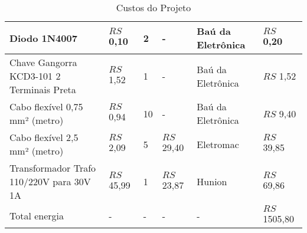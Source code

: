 \begin{table}[h!]
\begin{tabular}{| m{4cm}|m{2cm}|m{2cm}|m{2cm}|m{2cm}|m{2cm}|}
Diodo 1N4007 & $RS$ 0,10 & 2 & - & Baú da Eletrônica & $RS$ 0,20 \\\hline
Chave Gangorra KCD3-101 2 Terminais Preta & $RS$ 1,52 & 1 & - & Baú da Eletrônica & $RS$ 1,52 \\\hline
Cabo flexível 0,75 mm² (metro) & $RS$ 0,94 & 10 & - & Baú da Eletrônica & $RS$ 9,40 \\\hline
Cabo flexível 2,5 mm² (metro) & $RS$ 2,09 & 5 & $RS$ 29,40 & Eletromac & $RS$ 39,85 \\\hline
Transformador Trafo 110/220V para 30V 1A & $RS$ 45,99 & 1 & $RS$ 23,87 & Hunion & $RS$ 69,86 \\\hline
Total energia & - & - & - & - & $RS$ 1505,80 \\\hline



\end{tabular}
\caption{Custos do Projeto}
\label{tab:custos}
\end{table}






